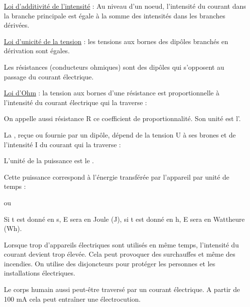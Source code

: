 \documentclass[11pt,a4paper]{article}
\begin{document}
\uline{Loi d’additivité de l’intensité} : Au niveau d'un noeud, l’intensité du courant dans la branche principale est égale à la somme des intensités dans les branches dérivées.

\uline{Loi d’unicité de la tension} : les tensions aux bornes des dipôles branchés en dérivation sont égales.


Les résistances (conducteurs ohmiques) sont des dipôles qui s’opposent au passage du courant électrique.

\uline{Loi d’Ohm} : la tension aux bornes d’une résistance est proportionnelle à l’intensité du courant électrique qui la traverse :

\begin{center}
    \LARGE{}
\end{center}

On appelle aussi résistance R ce coefficient de proportionnalité. Son unité est l’.


La , reçue ou fournie par un dipôle, dépend de la tension U à ses brones et de l’intensité I du courant qui la traverse :

\begin{center}
    \LARGE{}
\end{center}

L’unité de la puissance est le .

Cette puissance correspond à l’énergie transférée par l’appareil par unité de temps :

\begin{center}
    \LARGE{ ou }
\end{center}

Si t est donné en s, E sera en Joule (J), si t est donné en h, E sera en Wattheure (Wh).


Lorsque  trop d’appareils électriques sont utilisés en même temps, l’intensité du courant devient trop élevée. Cela peut provoquer des surchauffes et même des incendies. On utilise des disjoncteurs pour protéger les personnes et les installations électriques.

Le corps humain aussi peut-être traversé par un courant électrique. A partir de 100 mA cela peut entraîner une électrocution.
\end{document}
